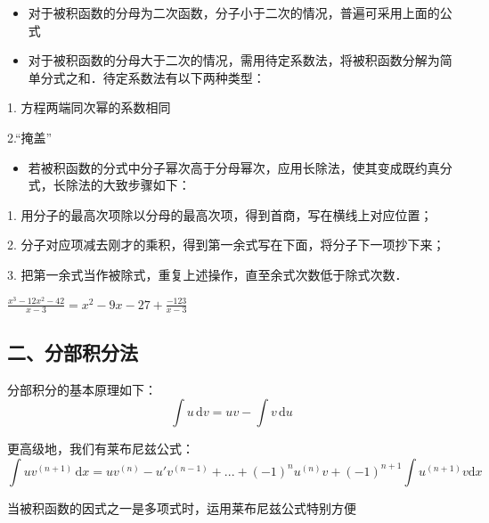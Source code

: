 \begin{itemize}
\item 对于被积函数的分母为二次函数，分子小于二次的情况，普遍可采用上面的公式
\end{itemize}
\begin{itemize}
\item 对于被积函数的分母大于二次的情况，需用待定系数法，将被积函数分解为简单分式之和．待定系数法有以下两种类型：
\end{itemize}
1. 方程两端同次幂的系数相同

2.“掩盖”

\begin{itemize}
\item 若被积函数的分式中分子幂次高于分母幂次，应用长除法，使其变成既约真分式，长除法的大致步骤如下：
\end{itemize}

1. 用分子的最高次项除以分母的最高次项，得到首商，写在横线上对应位置；

2. 分子对应项减去刚才的乘积，得到第一余式写在下面，将分子下一项抄下来；

3. 把第一余式当作被除式，重复上述操作，直至余式次数低于除式次数．
\begin{example}{}
$\displaystyle{\frac{x^3-12x^2-42}{x-3}=x^2-9x-27+\frac{-123}{x-3}}$ 
\end{example}
\subsection{二、分部积分法}
分部积分的基本原理如下：
$$\int u\,\mathrm{d}v=uv-\int v\,\mathrm{d}u$$

更高级地，我们有莱布尼兹公式：
$$\int uv^{(n+1)}\,\mathrm{d}x=uv^{(n)}-u'v^{(n-1)}+...+(-1)^nu^{(n)}v+(-1)^{n+1}\int u^{(n+1)}v\mathrm{d}x$$

当被积函数的因式之一是多项式时，运用莱布尼兹公式特别方便

